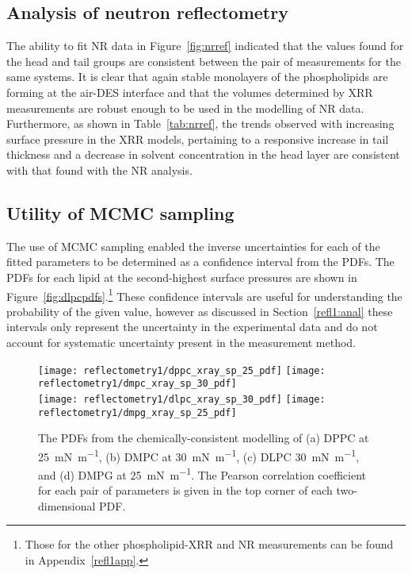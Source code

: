 \subsection{Analysis of neutron reflectometry}
The ability to fit NR data in Figure~\ref{fig:nrref} indicated that the values found for the head and tail groups are consistent between the pair of measurements for the same systems.
It is clear that again stable monolayers of the phospholipids are forming at the air-DES interface and that the volumes determined by XRR measurements are robust enough to be used in the modelling of NR data.
Furthermore, as shown in Table~\ref{tab:nrref}, the trends observed with increasing surface pressure in the XRR models, pertaining to a responsive increase in tail thickness and a decrease in solvent concentration in the head layer are consistent with that found with the NR analysis.

\subsection{Utility of MCMC sampling}
The use of MCMC sampling enabled the inverse uncertainties for each of the fitted parameters to be determined as a confidence interval from the PDFs.
The PDFs for each lipid at the second-highest surface pressures are shown in Figure~\ref{fig:dlpcpdfs}.\footnote{Those for the other phospholipid-XRR and NR measurements can be found in Appendix~\ref{refl1app}.}
These confidence intervals are useful for understanding the probability of the given value, however as discussed in Section~\ref{refl1:anal} these intervals only represent the uncertainty in the experimental data and do not account for systematic uncertainty present in the measurement method.
%
\begin{figure}
    \centering
    \texttt{[image: reflectometry1/dppc\_xray\_sp\_25\_pdf]}
    \texttt{[image: reflectometry1/dmpc\_xray\_sp\_30\_pdf]} \\
    \texttt{[image: reflectometry1/dlpc\_xray\_sp\_30\_pdf]}
    \texttt{[image: reflectometry1/dmpg\_xray\_sp\_25\_pdf]}
    \caption{The PDFs from the chemically-consistent modelling of (a) DPPC at \SI{25}{\milli\newton\per\meter}, (b) DMPC at \SI{30}{\milli\newton\per\meter}, (c) DLPC \SI{30}{\milli\newton\per\meter}, and (d) DMPG at \SI{25}{\milli\newton\per\meter}. The Pearson correlation coefficient for each pair of parameters is given in the top corner of each two-dimensional PDF.}
    \label{fig:pdfs3}
\end{figure}
%

